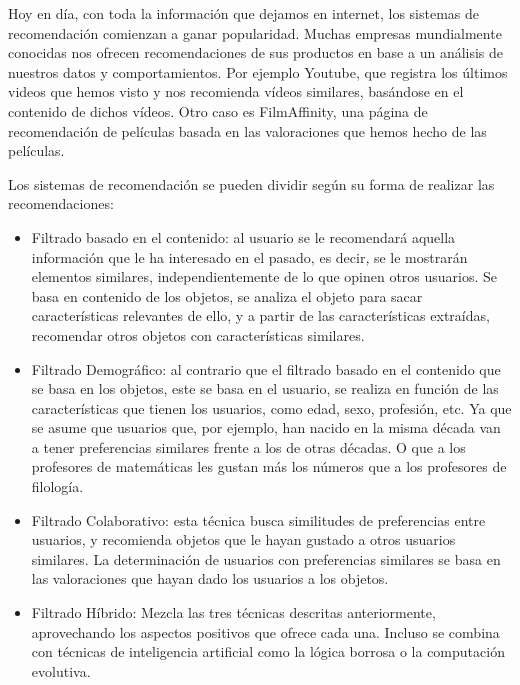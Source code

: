 Hoy en día, con toda la información que dejamos en internet, los sistemas de recomendación comienzan a ganar popularidad.
Muchas empresas mundialmente conocidas nos ofrecen recomendaciones de sus productos en base a un análisis de nuestros datos y comportamientos.
Por ejemplo Youtube, que registra los últimos videos que hemos visto y nos recomienda vídeos similares, basándose en el contenido de dichos vídeos. Otro caso es FilmAffinity, 
una página de recomendación de películas basada en las valoraciones que hemos hecho de las películas.

Los sistemas de recomendación se pueden dividir según su forma de realizar las recomendaciones:

\begin{itemize}
    \item Filtrado basado en el contenido\cite{filtradocontenido}: al usuario se le recomendará aquella información que le ha interesado en el pasado, es decir, se le mostrarán elementos similares, independientemente de lo que opinen otros usuarios. 
    Se basa en contenido de los objetos, se analiza el objeto para sacar características relevantes de ello, y a partir de las características 
    extraídas, recomendar otros objetos con características similares.   
    \item Filtrado Demográfico\cite{filtrademografico}: al contrario que el filtrado basado en el contenido que se basa en los objetos, este se basa en el usuario,
    se realiza en función de las características que tienen los usuarios, como edad, sexo, profesión, etc. Ya que se asume que usuarios que, por ejemplo,
    han nacido en la misma década van a tener preferencias similares frente a los de otras décadas. O que a los profesores de matemáticas les gustan más los números 
    que a los profesores de filología. 
    \item Filtrado Colaborativo\cite{filtradocolaborativo}: esta técnica busca similitudes de preferencias entre usuarios, y recomienda objetos 
    que le hayan gustado a otros usuarios similares. La determinación de usuarios con preferencias similares se basa en 
    las valoraciones que hayan dado los usuarios a los objetos.
    \item Filtrado Híbrido\cite{filtrahibrido}: Mezcla las tres técnicas descritas anteriormente, aprovechando los aspectos positivos
    que ofrece cada una. Incluso se combina con técnicas de inteligencia artificial como la lógica borrosa o la computación evolutiva. 
\end{itemize} 

